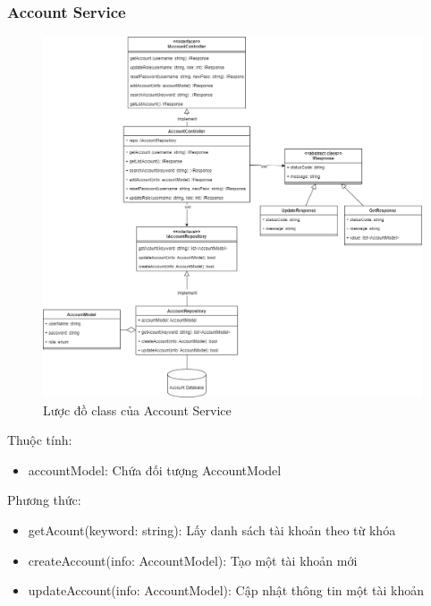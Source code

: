 \subsubsection{Account Service}
\begin{figure}[!htp]
	\centering
	\includegraphics[width=14cm]{img/Architecture/service/AccountService.png}
	\newline
	\caption{Lược đồ class của Account Service}
\end{figure}

Thuộc tính:
\begin{itemize}
	\item accountModel: Chứa đối tượng AccountModel
\end{itemize}
Phương thức:
\begin{itemize}
	\item getAcount(keyword: string): Lấy danh sách tài khoản theo từ khóa
	\item createAccount(info: AccountModel): Tạo một tài khoản mới
	\item updateAccount(info: AccountModel): Cập nhật thông tin một tài khoản
\end{itemize}

